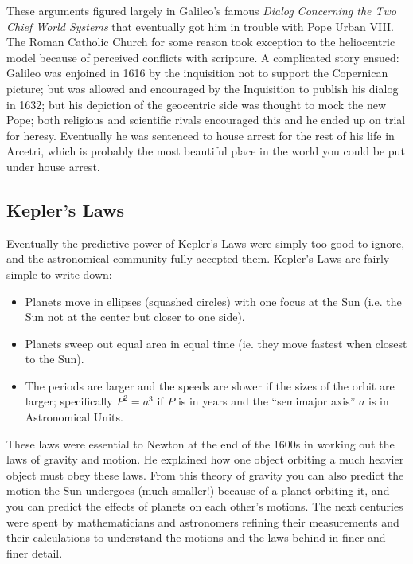 \documentclass[12pt, preprint]{aastex}
\begin{document}
These arguments figured largely in Galileo's famous {\it Dialog
  Concerning the Two Chief World Systems} that eventually got him in
trouble with Pope Urban VIII. The Roman Catholic Church for some
reason took exception to the heliocentric model because of perceived
conflicts with scripture. A complicated story ensued: Galileo was
enjoined in 1616 by the inquisition not to support the Copernican
picture; but was allowed and encouraged by the Inquisition to publish
his dialog in 1632; but his depiction of the geocentric side was
thought to mock the new Pope; both religious and scientific rivals
encouraged this and he ended up on trial for heresy. Eventually he was
sentenced to house arrest for the rest of his life in Arcetri, which
is probably the most beautiful place in the world you could be put
under house arrest.

\subsection{Kepler's Laws}

Eventually the predictive power of Kepler's Laws were simply too
good to ignore, and the astronomical community fully accepted them.  
Kepler's Laws are fairly simple to write down:
\begin{itemize}
  \item Planets move in ellipses (squashed circles) with one focus at
    the Sun (i.e. the Sun not at the center but closer to one side).
  \item Planets sweep out equal area in equal time (ie. they move
    fastest when closest to the Sun).
  \item The periods are larger and the speeds are slower if the sizes
    of the orbit are larger; specifically $P^2 = a^3$ if $P$ is in
    years and the ``semimajor axis'' $a$ is in Astronomical Units.
\end{itemize}

These laws were essential to Newton at the end of the 1600s in working
out the laws of gravity and motion. He explained how one object
orbiting a much heavier object must obey these laws. From this theory
of gravity you can also predict the motion the Sun undergoes (much
smaller!) because of a planet orbiting it, and you can predict the
effects of planets on each other's motions. The next centuries were
spent by mathematicians and astronomers refining their measurements
and their calculations to understand the motions and the laws behind
in finer and finer detail.
\end{document}

